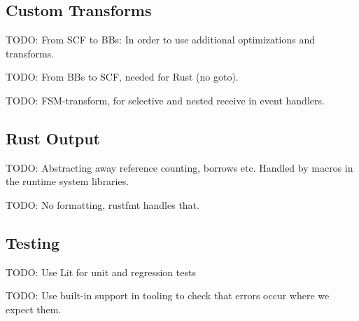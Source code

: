 \subsection{Custom Transforms}

TODO: From SCF to BBs: In order to use additional optimizations and
transforms.

TODO: From BBs to SCF, needed for Rust (no goto).

TODO: FSM-transform, for selective and nested receive in event handlers.

\subsection{Rust Output}

TODO: Abstracting away reference counting, borrows etc. Handled by macros in the runtime system libraries.

TODO: No formatting, rustfmt handles that.

\subsection{Testing}

TODO: Use Lit for unit and regression tests

TODO: Use built-in support in tooling to check that errors occur where we expect them.
